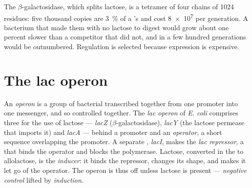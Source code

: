 \begin{example}\label{ex:b1:expression-control:economy}
The  $\beta$-galactosidase, which splits lactose, is a tetramer
of four chains of \qty{1024}{} residues: five thousand copies are
\qty{3}{\%} of a 's  and cost \qty{8e7}{}  per
generation. A bacterium that made them with no lactose to digest
would grow about one percent slower than a competitor that did not,
and in a few hundred generations would be outnumbered. Regulation is
selected because expression is expensive.
\end{example}

\section{The lac operon}

\begin{definition}\label{def:b1:expression-control:operon}
An \emph{operon} is a group of bacterial  transcribed together
from one promoter into one messenger, and so controlled together. The
\emph{lac operon} of \emph{E. coli} comprises three  for the use
of lactose --- \emph{lacZ} ($\beta$-galactosidase), \emph{lacY} (the
lactose permease that imports it) and \emph{lacA} --- behind a
promoter and an \emph{operator}, a short sequence overlapping the
promoter. A separate , \emph{lacI}, makes the \emph{lac
repressor}, a  that binds the operator and blocks the
polymerase. Lactose, converted in the  to allolactose, is the
\emph{inducer}: it binds the repressor, changes its shape, and makes
it let go of the operator. The operon is thus off unless lactose is
present --- \emph{negative control} lifted by \emph{induction}.
\end{definition}

